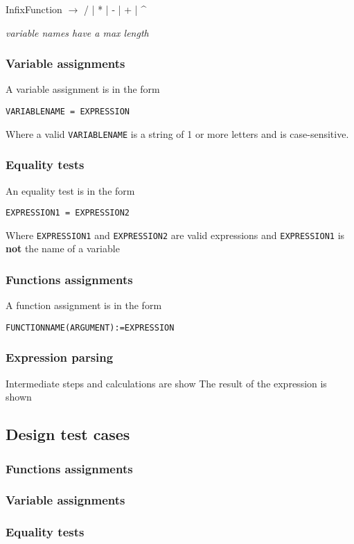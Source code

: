 \documentclass[11pt,a4paper]{article}
\begin{document}
InfixFunction \(\rightarrow\) / | * | - | + | \^{}

\emph{variable names have a max length}


\subsubsection{Variable assignments}
\label{sec:orgheadline4}
A variable assignment is in the form

\texttt{VARIABLENAME = EXPRESSION}

Where a valid \texttt{VARIABLENAME} is a string of 1 or more letters and
is case-sensitive.
\subsubsection{Equality tests}
\label{sec:orgheadline5}
An equality test is in the form

\texttt{EXPRESSION1 = EXPRESSION2}

Where \texttt{EXPRESSION1} and \texttt{EXPRESSION2} are valid expressions and
\texttt{EXPRESSION1} is \textbf{not} the name of a variable

\subsubsection{Functions assignments}
\label{sec:orgheadline6}
A function assignment is in the form

\texttt{FUNCTIONNAME(ARGUMENT):=EXPRESSION}
\subsubsection{Expression parsing}
\label{sec:orgheadline7}
Intermediate steps and calculations are show
The result of the expression is shown
\subsection{Design test cases}
\label{sec:orgheadline13}
\subsubsection{Functions assignments}
\label{sec:orgheadline9}
\subsubsection{Variable assignments}
\label{sec:orgheadline10}
\subsubsection{Equality tests}
\label{sec:orgheadline11}
\end{document}
